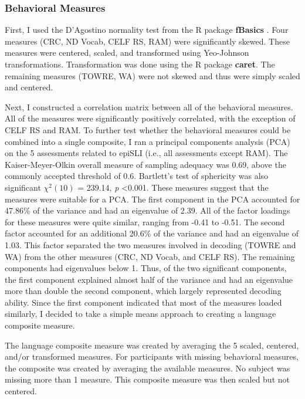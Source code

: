 \documentclass[../dissertation.tex]{subfiles}
\begin{document}
\subsubsection{Behavioral Measures}
	First, I used the D'Agostino normality test from the R package \textbf{fBasics} \citep{fBasics}. Four measures (CRC, ND Vocab, CELF RS, RAM) were significantly skewed. These measures were centered, scaled, and transformed using Yeo-Johnson transformations. Transformation was done using the R package \textbf{caret}. The remaining measures (TOWRE, WA) were not skewed and thus were simply scaled and centered. \par
	Next, I constructed a correlation matrix between all of the behavioral measures. All of the measures were significantly positively correlated, with the exception of CELF RS and RAM. To further test whether the behavioral measures could be combined into a single composite, I ran a principal components analysis (PCA) on the 5 assessments related to epiSLI (i.e., all assessments except RAM). The Kaiser-Meyer-Olkin overall measure of sampling adequacy was 0.69, above the commonly accepted threshold of 0.6. Bartlett's test of sphericity was also significant $\chi^{2}(10)$  = 239.14, \textit{p} \textless 0.001. These measures suggest that the measures were suitable for a PCA.
	The first component in the PCA accounted for 47.86\% of the variance and had an eigenvalue of 2.39. All of the factor loadings for these measures were quite similar, ranging from -0.41 to -0.51. The second factor accounted for an additional 20.6\% of the variance and had an eigenvalue of 1.03. This factor separated the two measures involved in decoding (TOWRE and WA) from the other measures (CRC, ND Vocab, and CELF RS). The remaining components had eigenvalues below 1. Thus, of the two significant components, the first component explained almost half of the variance and had an eigenvalue more than double the second component, which largely represented decoding ability. Since the first component indicated that most of the measures loaded similarly, I decided to take a simple means approach to creating a language composite measure. \par
	The language composite measure was created by averaging the 5 scaled, centered, and/or transformed measures. For participants with missing behavioral measures, the composite was created by averaging the available measures. 	No subject was missing more than 1 measure. This composite measure was then scaled but not centered.
		
\end{document}
